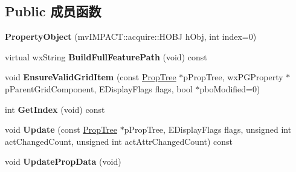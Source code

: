 \subsection*{Public 成员函数}
\begin{DoxyCompactItemize}
\item 
\hypertarget{class_property_object_a1074bfaddc2c285f98dce5f16fe67786}{{\bfseries Property\+Object} (mv\+I\+M\+P\+A\+C\+T\+::acquire\+::\+H\+O\+B\+J h\+Obj, int index=0)}\label{class_property_object_a1074bfaddc2c285f98dce5f16fe67786}

\item 
\hypertarget{class_property_object_ad51b426b9ff1c8180d461fc5d90a9532}{virtual wx\+String {\bfseries Build\+Full\+Feature\+Path} (void) const }\label{class_property_object_ad51b426b9ff1c8180d461fc5d90a9532}

\item 
\hypertarget{class_property_object_ae5508f2541467851f48ec3803397d75e}{void {\bfseries Ensure\+Valid\+Grid\+Item} (const \hyperlink{class_prop_tree}{Prop\+Tree} $\ast$p\+Prop\+Tree, wx\+P\+G\+Property $\ast$p\+Parent\+Grid\+Component, E\+Display\+Flags flags, bool $\ast$pbo\+Modified=0)}\label{class_property_object_ae5508f2541467851f48ec3803397d75e}

\item 
\hypertarget{class_property_object_ae34322fa1b7d930272e1fd1fe2ff7c3b}{int {\bfseries Get\+Index} (void) const }\label{class_property_object_ae34322fa1b7d930272e1fd1fe2ff7c3b}

\item 
\hypertarget{class_property_object_a79a7ef329883554936d9cd105aab8a55}{void {\bfseries Update} (const \hyperlink{class_prop_tree}{Prop\+Tree} $\ast$p\+Prop\+Tree, E\+Display\+Flags flags, unsigned int act\+Changed\+Count, unsigned int act\+Attr\+Changed\+Count) const }\label{class_property_object_a79a7ef329883554936d9cd105aab8a55}

\item 
\hypertarget{class_property_object_a0de7f6c3b3348023fbfbf5ba1ec0984b}{void {\bfseries Update\+Prop\+Data} (void)}\label{class_property_object_a0de7f6c3b3348023fbfbf5ba1ec0984b}

\end{DoxyCompactItemize}
